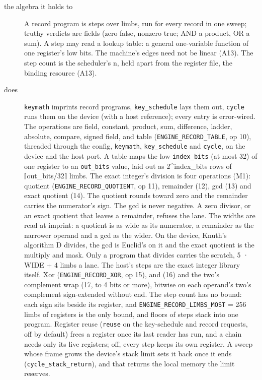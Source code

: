 \begin{description}
\item[{the algebra it holds to}] A record program is steps over limbs, run for every record in one sweep; truthy verdicts are fields (zero false, nonzero true; AND a product, OR a sum). A step may read a lookup table: a general one-variable function of one register's low bits. The machine's edges need not be linear (A13). The step count is the scheduler's n, held apart from the register file, the binding resource (A13).
\item[{does}] \texttt{keymath} imprints record programs, \texttt{key\_\allowbreak{}schedule} lays them out, \texttt{cycle} runs them on the device (with a host reference); every entry is error-wired. The operations are field, constant, product, sum, difference, ladder, absolute, compare, signed field, and table (\texttt{ENGINE\_\allowbreak{}RECORD\_\allowbreak{}TABLE}, op 10), threaded through the config, \texttt{keymath}, \texttt{key\_\allowbreak{}schedule} and \texttt{cycle}, on the device and the host port. A table maps the low \texttt{index\_\allowbreak{}bits} (at most 32) of one register to an \texttt{out\_\allowbreak{}bits} value, laid out as 2\textasciicircum{}index\_\allowbreak{}bits rows of ⌈out\_\allowbreak{}bits/32⌉ limbs. The exact integer's division is four operations (M1): quotient (\texttt{ENGINE\_\allowbreak{}RECORD\_\allowbreak{}QUOTIENT}, op 11), remainder (12), gcd (13) and exact quotient (14). The quotient rounds toward zero and the remainder carries the numerator's sign. The gcd is never negative. A zero divisor, or an exact quotient that leaves a remainder, refuses the lane. The widths are read at imprint: a quotient is as wide as its numerator, a remainder as the narrower operand and a gcd as the wider. On the device, Knuth's algorithm D divides, the gcd is Euclid's on it and the exact quotient is the multiply and mask. Only a program that divides carries the scratch, 5 · WIDE + 4 limbs a lane. The host's steps are the exact integer library itself. Xor (\texttt{ENGINE\_\allowbreak{}RECORD\_\allowbreak{}XOR}, op 15), and (16) and the two's complement wrap (17, to 4 bits or more), bitwise on each operand's two's complement sign-extended without end. The step count has no bound: each sign sits beside its register, and \texttt{ENGINE\_\allowbreak{}RECORD\_\allowbreak{}LIMBS\_\allowbreak{}MOST} = 256 limbs of registers is the only bound, and floors of steps stack into one program. Register reuse (\texttt{reuse} on the key-schedule and record requests, off by default) frees a register once its last reader has run, and a chain needs only its live registers; off, every step keeps its own register. A sweep whose frame grows the device's stack limit sets it back once it ends (\texttt{cycle\_\allowbreak{}stack\_\allowbreak{}return}), and that returns the local memory the limit reserves.

\end{description}
